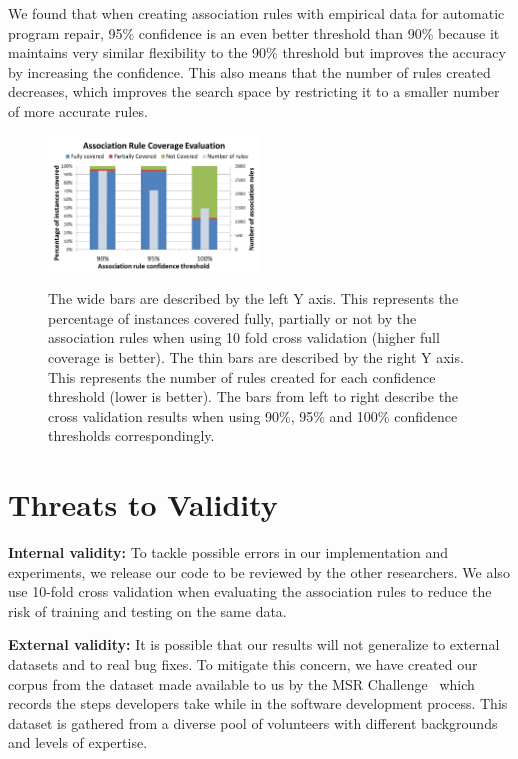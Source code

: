 \documentclass[sigconf]{acmart}
\begin{document}
We found that when creating association
rules with empirical data for automatic program repair, 95\% confidence
is an even better threshold than 90\% because it maintains very similar flexibility 
to the 90\% threshold but improves the accuracy by increasing the confidence. 
This also means that the number of rules created decreases, which improves
the search space by restricting it to a smaller number of more accurate rules.
 

\begin{figure}[h]
\caption{The wide bars are described by the left Y axis. This represents
the percentage of instances covered
fully, partially or not by the association rules when using 10 fold
cross validation (higher full coverage is better). 
The thin bars are described by the right Y axis.
This represents the number of rules created for each confidence threshold 
(lower is better).
The bars from left to right describe the cross validation
results when using 90\%, 95\% and 100\% confidence thresholds correspondingly.}
\centering
\includegraphics[width=0.5\textwidth]{images/assocRuleEval.png}
\label{ruleEvaluation}
\end{figure}

\section{Threats to Validity} \label{threatsVal}

\noindent\textbf{Internal validity:}
To tackle possible errors in our implementation and experiments, we release our code
to be reviewed by the other researchers. We also use 10-fold cross validation 
when evaluating the association rules
to reduce the risk of training and testing on the same data.  

\noindent\textbf{External validity:} 
It is possible 
that our results will not generalize to external datasets and to
real bug fixes. To mitigate this concern, we have created our corpus 
from the dataset made available to us by the MSR Challenge~\cite{msr18challenge}
which records the steps developers take while in the software development process.
This dataset is gathered from a diverse pool of volunteers with different 
backgrounds and levels of expertise.
\end{document}
